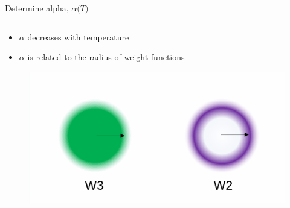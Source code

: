 \documentclass{beamer}
\begin{document}
\begin{frame}{Determine alpha, $\alpha{(}T)$}
\begin{columns}[t]
\begin{block}{}
\begin{itemize}
			    \item $\alpha$ decreases with temperature 
			    \item $\alpha$ is related to the radius of weight functions
			\end{itemize}
        \begin{figure}
            \centering
            \includegraphics[width=\columnwidth]{figs/w2-w3-radius.png}
          \end{figure}
	    \end{block}          
	\end{columns}	
\end{frame}
\end{document}
